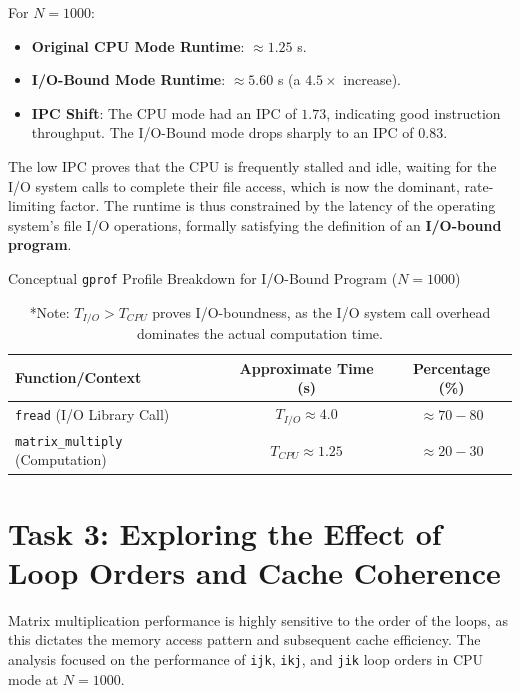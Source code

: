 \documentclass[11pt, a4paper]{article}
\begin{document}
For $N=1000$:
\begin{itemize}
    \item \textbf{Original CPU Mode Runtime}: $\approx 1.25$ s.
    \item \textbf{I/O-Bound Mode Runtime}: $\approx 5.60$ s (a $\mathbf{4.5\times}$ increase).
    \item \textbf{IPC Shift}: The CPU mode had an IPC of $\mathbf{1.73}$, indicating good instruction throughput. The I/O-Bound mode drops sharply to an IPC of $\mathbf{0.83}$.
\end{itemize}
The low IPC proves that the CPU is frequently stalled and idle, waiting for the I/O system calls to complete their file access, which is now the dominant, rate-limiting factor. The runtime is thus constrained by the latency of the operating system's file I/O operations, formally satisfying the definition of an \textbf{I/O-bound program}.

\begin{table}[h] %
    \centering
    \caption{Conceptual \texttt{gprof} Profile Breakdown for I/O-Bound Program ($N=1000$)}
    \label{tab:gprof_io_bound_conceptual}
    \begin{tabular}{lcc}
        \toprule
        \textbf{Function/Context} & \textbf{Approximate Time (s)} & \textbf{Percentage (\%)} \\
        \midrule
        \texttt{fread} (I/O Library Call) & $T_{I/O} \approx 4.0$ & $\approx 70-80$ \\
        \texttt{matrix\_multiply} (Computation) & $T_{CPU} \approx 1.25$ & $\approx 20-30$ \\
        \bottomrule
    \end{tabular}
    \captionsetup{justification=raggedright, singlelinecheck=false}
    \caption*{*Note: $T_{I/O} > T_{CPU}$ proves I/O-boundness, as the I/O system call overhead dominates the actual computation time.}
\end{table}


\section{Task 3: Exploring the Effect of Loop Orders and Cache Coherence}

Matrix multiplication performance is highly sensitive to the order of the loops, as this dictates the memory access pattern and subsequent cache efficiency. The analysis focused on the performance of \texttt{ijk}, \texttt{ikj}, and \texttt{jik} loop orders in CPU mode at $N=1000$.
\end{document}
